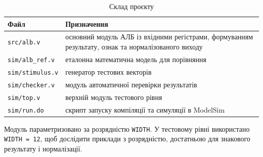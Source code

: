 \documentclass[12pt,a4paper]{article}
\begin{document}
\begin{table}[H]
    \centering
    \renewcommand{\arraystretch}{1.25}
    \begin{tabular}{|p{}|p{}|}
        \hline
        \textbf{Файл} & \textbf{Призначення} \\
        \hline
        \texttt{src/alb.v} & основний модуль АЛБ із вхідними регістрами, формуванням результату, ознак та нормалізованого виходу \\
        \hline
        \texttt{sim/alb\_ref.v} & еталонна математична модель для порівняння \\
        \hline
        \texttt{sim/stimulus.v} & генератор тестових векторів \\
        \hline
        \texttt{sim/checker.v} & модуль автоматичної перевірки результатів \\
        \hline
        \texttt{sim/top.v} & верхній модуль тестового рівня \\
        \hline
        \texttt{sim/run.do} & скрипт запуску компіляції та симуляції в ModelSim \\
        \hline
    \end{tabular}
    \caption{Склад проєкту}
\end{table}

Модуль параметризовано за розрядністю \texttt{WIDTH}. У тестовому рівні використано \texttt{WIDTH = 12}, щоб дослідити приклади з розрядністю, достатньою для знакового результату і нормалізації.
\end{document}
